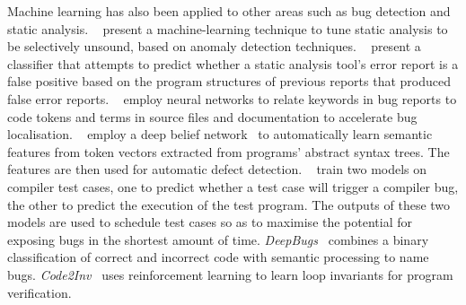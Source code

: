 Machine learning has also been applied to other areas such as bug detection and static analysis.
\citeauthor{Heo2017}~\cite{Heo2017} present a machine-learning technique to tune static analysis to be selectively unsound, based on anomaly detection techniques.
\citeauthor{Koc2017}~\cite{Koc2017} present a classifier that attempts to predict whether a static analysis tool's error report is a false positive based on the program structures of previous reports that produced false error reports.
\citeauthor{Lam2016}~\cite{Lam2016} employ neural networks to relate keywords in bug reports to code tokens and terms in source files and documentation to accelerate bug localisation.
\citeauthor{Wang2016c}~\cite{Wang2016c} employ a deep belief network~\cite{Hinton2006a} to automatically learn semantic features from token vectors extracted from programs' abstract syntax trees. The features are then used for automatic defect detection.
\citeauthor{Chen2017}~\cite{Chen2017} train two models on compiler test cases, one to predict whether a test case will trigger a compiler bug, the other to predict the execution of the test program. The outputs of these two models are used to schedule test cases so as to maximise the potential for exposing bugs in the shortest amount of time.
\emph{DeepBugs}~\cite{Pradel2018} combines a binary classification of correct and incorrect code with semantic processing to name bugs.
\emph{Code2Inv}~\cite{Si2018} uses reinforcement learning to learn loop invariants for program verification.

